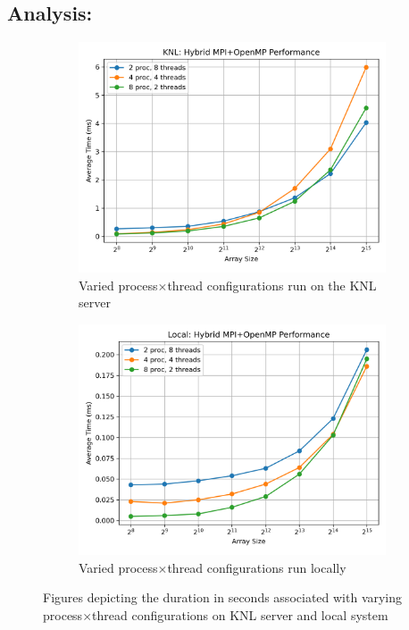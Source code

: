 \documentclass[11pt]{article}
\begin{document}
\subsection*{Analysis:}

\begin{figure}[H]
\centering
\begin{subfigure}[t]{0.48\textwidth}
  \centering
    \includegraphics[width=\textwidth]{./images/knlq7.png}
  \caption{Varied process$\times$thread configurations run on the KNL server}\label{fig:knlq7}
\end{subfigure}%
\hfill
\begin{subfigure}[t]{0.48\textwidth}
  \centering
    \includegraphics[width=\textwidth]{./images/localq7.png}
  \caption{Varied process$\times$thread configurations run locally}\label{fig:localq7}
\end{subfigure}%
\caption{Figures depicting the duration in seconds associated with varying process$\times$thread configurations on KNL server and local system}
\label{fig:gq7}
\end{figure}
\end{document}
